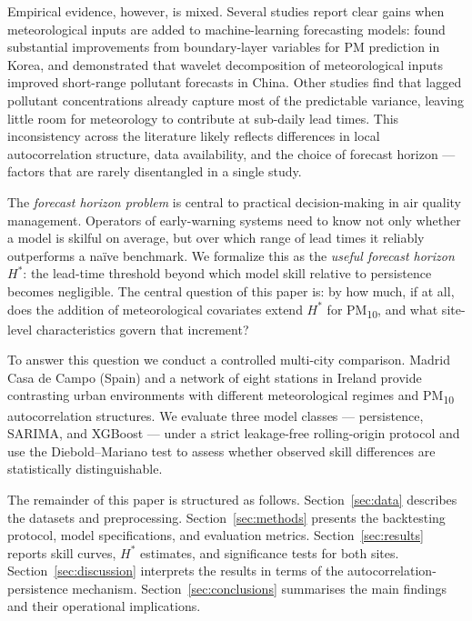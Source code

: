\documentclass[12pt,a4paper]{article}
\newcommand{\PMten}{PM\textsubscript{10}}
\begin{document}
Empirical evidence, however, is mixed.  Several studies report clear gains
when meteorological inputs are added to machine-learning forecasting models:
\citet{Pak2018} found substantial improvements from boundary-layer variables
for PM prediction in Korea, and \citet{Bai2018} demonstrated that wavelet
decomposition of meteorological inputs improved short-range pollutant
forecasts in China.  Other studies find that lagged pollutant concentrations
already capture most of the predictable variance, leaving little room for
meteorology to contribute at sub-daily lead times.  This inconsistency across
the literature likely reflects differences in local autocorrelation structure,
data availability, and the choice of forecast horizon — factors that are
rarely disentangled in a single study.

The \emph{forecast horizon problem} is central to practical decision-making in
air quality management.  Operators of early-warning systems need to know not
only whether a model is skilful on average, but over which range of lead times
it reliably outperforms a naïve benchmark.  We formalize this as the
\emph{useful forecast horizon} $H^*$: the lead-time threshold beyond which
model skill relative to persistence becomes negligible.  The central question
of this paper is: by how much, if at all, does the addition of meteorological
covariates extend $H^*$ for \PMten{}, and what site-level characteristics
govern that increment?

To answer this question we conduct a controlled multi-city comparison.
Madrid Casa de Campo (Spain) and a network of eight stations in Ireland provide
contrasting urban environments with different meteorological regimes and
\PMten{} autocorrelation structures.  We evaluate three model classes —
persistence, SARIMA, and XGBoost — under a strict leakage-free
rolling-origin protocol and use the Diebold--Mariano test
\citep{Diebold1995, Harvey1997} to assess whether observed skill differences
are statistically distinguishable.

The remainder of this paper is structured as follows.  Section~\ref{sec:data}
describes the datasets and preprocessing.  Section~\ref{sec:methods} presents
the backtesting protocol, model specifications, and evaluation metrics.
Section~\ref{sec:results} reports skill curves, $H^*$ estimates, and
significance tests for both sites.  Section~\ref{sec:discussion} interprets
the results in terms of the autocorrelation-persistence mechanism.
Section~\ref{sec:conclusions} summarises the main findings and their
operational implications.
\end{document}
